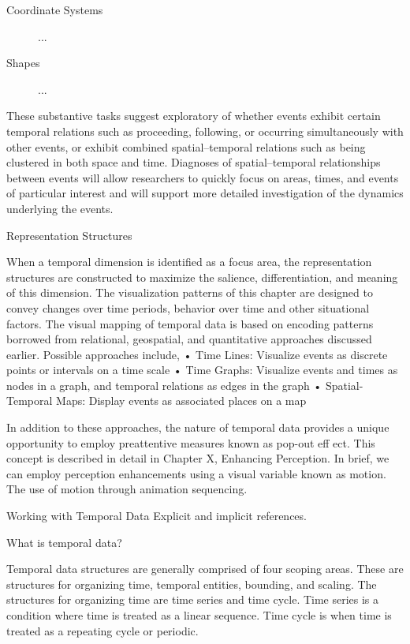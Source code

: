 \begin{description}
	\item[Coordinate Systems] ...
	\item[Shapes] ...
\end{description}

These substantive tasks suggest exploratory of whether events exhibit certain temporal relations such as proceeding, following, or occurring simultaneously with other events, or exhibit combined spatial–temporal relations such as being clustered in both space and time. Diagnoses of spatial–temporal relationships between events will allow researchers to quickly focus on areas, times, and events of particular interest and will support more detailed investigation of the dynamics underlying the events.

Representation Structures

When a temporal dimension is identified as a focus area, the representation structures are constructed to maximize the salience, differentiation, and meaning of this dimension. The visualization patterns of this chapter are designed to convey changes over time periods, behavior over time and other situational factors. The visual mapping of temporal data is based on encoding patterns borrowed from relational, geospatial, and quantitative approaches discussed earlier. Possible approaches include,
• Time Lines: Visualize events as discrete points or intervals on a time scale
• Time Graphs: Visualize events and times as nodes in a graph, and temporal relations as edges in the
graph
• Spatial-Temporal Maps: Display events as associated places on a map

In addition to these approaches, the nature of temporal data provides a unique opportunity to employ preattentive measures known as pop-out eff ect. This concept is described in detail in Chapter X, Enhancing Perception. In brief, we can employ perception enhancements using a visual variable known as motion. The use of motion through animation sequencing.

Working with Temporal Data
Explicit and implicit references.

What is temporal data?

Temporal data structures are generally comprised of four scoping areas. These are structures for organizing time, temporal entities, bounding, and scaling. The structures for organizing time are time series and time cycle. Time series is a condition where time is treated as a linear sequence. Time cycle is when time is treated as a repeating cycle or periodic.

